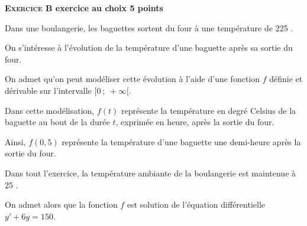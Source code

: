 \textbf{\large\textsc{Exercice B} \hfill exercice au choix \hfill 5 points}  

\medskip


\medskip

Dans une boulangerie, les baguettes sortent du four à une température de 225 \textcelsius.

On s'intéresse à l'évolution de la température d'une baguette après sa sortie du four.

On admet qu'on peut modéliser cette évolution à l'aide d'une fonction $f$ définie et dérivable sur l'intervalle $[0~;~+\infty[$.

 Dans cette modélisation, $f(t)$ représente la température en degré Celsius de la baguette au bout de la durée $t$, exprimée en heure, après la sortie du four.
 
Ainsi, $f(0,5)$ représente la température d'une baguette une demi-heure après la sortie du four.

Dans tout l'exercice, la température ambiante de la boulangerie est maintenue à 25 \textcelsius.

On admet alors que la fonction $f$ est solution de l'équation différentielle $y'+ 6y = 150$.

\medskip

